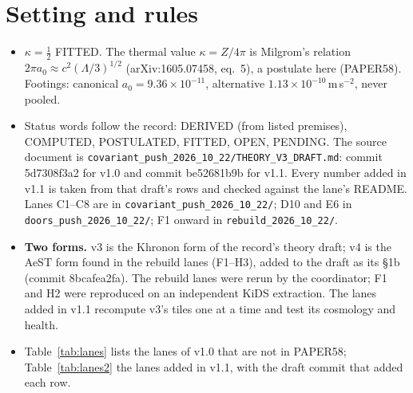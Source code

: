 \documentclass[10pt]{article}
\begin{document}
\begin{abstract}
\begin{enumerate}
\item \textbf{What passes.} Cassini (all 24 cells, by $4.8\times10^{7}$ to $5.1\times10^{9}$), the planets, the outer globulars (which set $L_\star\ge21.68$ / 22.85\,pc), and the strong field: PASS on all five tiles, scoped to static non-rotating black holes, with strong coupling an estimate (P3).
\item \textbf{Pending.} The Khronon-native nonlinear production run (L1) is in progress; no result is given. Gaia DR4 is the sealed decisive test of screening: screened $\gamma_v-1\approx8.1\times10^{-6}$ against $\gamma_v\approx1.17$ for the unscreened reading.
\end{enumerate}
\end{abstract}

\section{Setting and rules}
\begin{itemize}
\item $\kappa=\tfrac12$ FITTED. The thermal value $\kappa=Z/4\pi$ is Milgrom's relation $2\pi a_0\approx c^2(\Lambda/3)^{1/2}$ (arXiv:1605.07458, eq.~5), a postulate here (PAPER58). Footings: canonical $a_0=9.36\times10^{-11}$, alternative $1.13\times10^{-10}$\,m\,s$^{-2}$, never pooled.
\item Status words follow the record: DERIVED (from listed premises), COMPUTED, POSTULATED, FITTED, OPEN, PENDING. The source document is \texttt{covariant\_push\_2026\_10\_22/THEORY\_V3\_DRAFT.md}: commit 5d7308f3a2 for v1.0 and commit be52681b9b for v1.1. Every number added in v1.1 is taken from that draft's rows and checked against the lane's README. Lanes C1--C8 are in \texttt{covariant\_push\_2026\_10\_22/}; D10 and E6 in \texttt{doors\_push\_2026\_10\_22/}; F1 onward in \texttt{rebuild\_2026\_10\_22/}.
\item \textbf{Two forms.} v3 is the Khronon form of the record's theory draft; v4 is the AeST form found in the rebuild lanes (F1--H3), added to the draft as its \S1b (commit 8bcafea2fa). The rebuild lanes were rerun by the coordinator; F1 and H2 were reproduced on an independent KiDS extraction. The lanes added in v1.1 recompute v3's tiles one at a time and test its cosmology and health.
\item Table~\ref{tab:lanes} lists the lanes of v1.0 that are not in PAPER58; Table~\ref{tab:lanes2} the lanes added in v1.1, with the draft commit that added each row.
\end{itemize}
\end{document}
